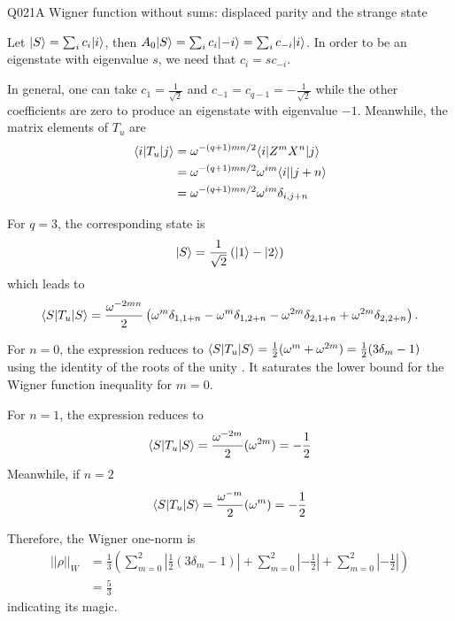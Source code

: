 \begin{entry}{Q021}{A Wigner function without sums: displaced parity and the strange state}
\begin{solution}[a]
\end{solution}

\begin{solution}[b]
Let $\lvert S \rangle = \sum_i c_i\lvert i \rangle$, then $A_0\lvert S \rangle=\sum_i c_i\lvert -i \rangle=\sum_i c_{-i}\lvert i \rangle$. In order to be an eigenstate with eigenvalue $s$, we need that $c_i = sc_{-i}$. 

In general, one can take $c_1=\frac{1}{\sqrt{2}}$ and $c_{-1}=c_{q-1}=-\frac{1}{\sqrt{2}}$ while the other coefficients are zero to produce an eigenstate with eigenvalue $-1$. Meanwhile, the matrix elements of $T_u$ are 
\begin{equation}
\begin{split}
    \langle i \vert T_u \vert j \rangle&=  \omega^{-(q+1)mn/2} \langle i \vert Z^mX^n \vert j \rangle \\
    &= \omega^{-(q+1)mn/2} \omega^{im} \langle i \vert  \vert j+n \rangle\\
    &=  \omega^{-(q+1)mn/2} \omega^{im} \delta_{i,j+n}
\end{split}
\end{equation}

For $q=3$, the corresponding state is
\begin{equation}
    \lvert S \rangle = \frac{1}{\sqrt{2}} \left(\lvert 1 \rangle- \lvert 2 \rangle\right)
\end{equation}
which leads to 
\begin{equation}
    \langle S \vert T_u \vert S \rangle= \frac{\omega^{-2mn}}{2} \left(\omega^{m} \delta_{1,1+n} -  \omega^{m} \delta_{1,2+n}-  \omega^{2m} \delta_{2,1+n} +  \omega^{2m} \delta_{2,2+n} \right).
\end{equation}

For $n=0$, the expression reduces to $ \langle S \vert T_u \vert S \rangle= \frac{1}{2}(\omega^{m}+\omega^{2m})=\frac{1}{2}(3\delta_m -1)$ using the identity of the roots of the unity . It saturates the lower bound for the Wigner function inequality for $m=0$.


For $n=1$, the expression reduces to 
$$ \langle S \vert T_u \vert S \rangle= \frac{\omega^{-2m}}{2}(\omega^{2m})=-\frac{1}{2}$$ 
Meanwhile, if $n=2$
$$\langle S \vert T_u \vert S \rangle= \frac{\omega^{-m}}{2}(\omega^{m}) =-\frac{1}{2}$$


Therefore, the Wigner one-norm is
\begin{equation}
\begin{split}
    ||\rho||_W &=  \frac{1}{3} \left(\sum_{m=0}^{2} \left| \frac{1}{2}(3\delta_m -1) \right| + \sum_{m=0}^{2} \left| -\frac{1}{2} \right| + \sum_{m=0}^{2} \left| -\frac{1}{2} \right|\right)\\
    &= \frac{5}{3}
\end{split}
\end{equation}
indicating its magic.


\end{solution}
\end{entry}
